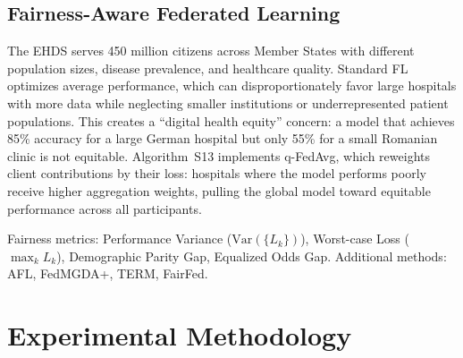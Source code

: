 \documentclass[conference]{IEEEtran}
\begin{document}
\subsection{Fairness-Aware Federated Learning}

The EHDS serves 450 million citizens across Member States with different population sizes, disease prevalence, and healthcare quality. Standard FL optimizes average performance, which can disproportionately favor large hospitals with more data while neglecting smaller institutions or underrepresented patient populations. This creates a ``digital health equity'' concern: a model that achieves 85\% accuracy for a large German hospital but only 55\% for a small Romanian clinic is not equitable. Algorithm~S13 implements q-FedAvg, which reweights client contributions by their loss: hospitals where the model performs poorly receive higher aggregation weights, pulling the global model toward equitable performance across all participants.

\begin{figure}[htbp]
\centering
{}
\end{figure}

Fairness metrics: Performance Variance ($\text{Var}(\{L_k\})$), Worst-case Loss ($\max_k L_k$), Demographic Parity Gap, Equalized Odds Gap. Additional methods: AFL, FedMGDA+, TERM, FairFed.


\section{Experimental Methodology}
\label{app:methodology}
\end{document}
